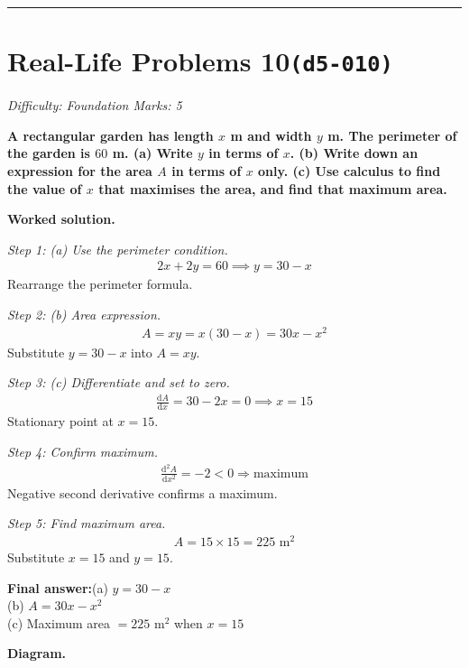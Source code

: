 \documentclass[11pt]{article}
\newcommand{\question}[1]{\par\medskip\noindent\textbf{#1}\par}
\begin{document}
\medskip\hrule

\section*{Real-Life Problems 10\quad\small\texttt{(d5-010)}}
\textit{Difficulty: Foundation \quad\textbar\quad Marks: 5}

\question{A rectangular garden has length \( x \) m and width \( y \) m. The perimeter of the garden is \( 60 \) m. (a) Write \( y \) in terms of \( x \). (b) Write down an expression for the area \( A \) in terms of \( x \) only. (c) Use calculus to find the value of \( x \) that maximises the area, and find that maximum area.}

\textbf{Worked solution.}

\textit{Step 1: (a) Use the perimeter condition.}
\[\begin{gathered}
2x + 2y = 60 \implies y = 30 - x
\end{gathered}\]
Rearrange the perimeter formula.

\textit{Step 2: (b) Area expression.}
\[\begin{gathered}
A = xy = x(30 - x) = 30x - x^2
\end{gathered}\]
Substitute \( y = 30 - x \) into \( A = xy \).

\textit{Step 3: (c) Differentiate and set to zero.}
\[\begin{gathered}
\frac{\mathrm{d}A}{\mathrm{d}x} = 30 - 2x = 0 \implies x = 15
\end{gathered}\]
Stationary point at \( x = 15 \).

\textit{Step 4: Confirm maximum.}
\[\begin{gathered}
\frac{\mathrm{d}^2A}{\mathrm{d}x^2} = -2 < 0 \Rightarrow \text{maximum}
\end{gathered}\]
Negative second derivative confirms a maximum.

\textit{Step 5: Find maximum area.}
\[\begin{gathered}
A = 15 \times 15 = 225 \text{ m}^2
\end{gathered}\]
Substitute \( x = 15 \) and \( y = 15 \).

\begin{answerbox}
\textbf{Final answer:}\quad (a) \(\displaystyle  y = 30 - x \) \\[3pt]  (b) \(\displaystyle  A = 30x - x^2 \) \\[3pt]  (c) Maximum area \(\displaystyle  = 225 \text{ m}^2 \) when \(\displaystyle  x = 15 \)
\end{answerbox}
\textbf{Diagram.}
\end{document}

